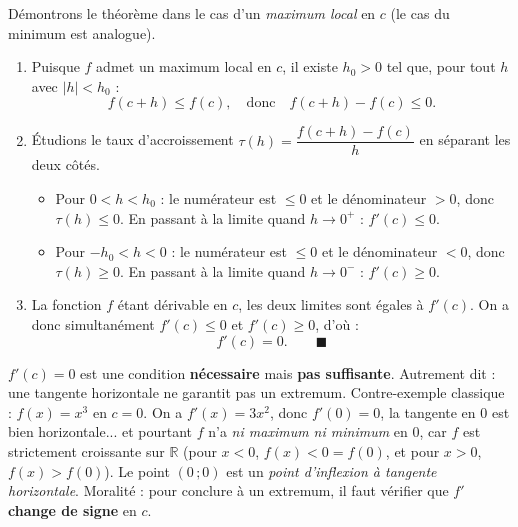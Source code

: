 \documentclass[11pt]{article}
\begin{document}
\begin{experience}
Démontrons le théorème dans le cas d'un \emph{maximum local} en $c$ (le cas du minimum est analogue).
\begin{enumerate}
\item Puisque $f$ admet un maximum local en $c$, il existe $h_0 > 0$ tel que, pour tout $h$ avec $|h| < h_0$ :
\[ f(c+h) \leq f(c), \quad \text{donc} \quad f(c+h) - f(c) \leq 0. \]
\item Étudions le taux d'accroissement $\tau(h) = \dfrac{f(c+h)-f(c)}{h}$ en séparant les deux côtés.
\begin{itemize}
\item Pour $0 < h < h_0$ : le numérateur est $\leq 0$ et le dénominateur $> 0$, donc $\tau(h) \leq 0$. En passant à la limite quand $h \to 0^+$ : $f'(c) \leq 0$.
\item Pour $-h_0 < h < 0$ : le numérateur est $\leq 0$ et le dénominateur $< 0$, donc $\tau(h) \geq 0$. En passant à la limite quand $h \to 0^-$ : $f'(c) \geq 0$.
\end{itemize}
\item La fonction $f$ étant dérivable en $c$, les deux limites sont égales à $f'(c)$. On a donc simultanément $f'(c) \leq 0$ et $f'(c) \geq 0$, d'où :
\[ f'(c) = 0. \qquad \blacksquare \]
\end{enumerate}
\end{experience}

\begin{attention}
$f'(c) = 0$ est une condition \textbf{nécessaire} mais \textbf{pas suffisante}. Autrement dit : une tangente horizontale ne garantit pas un extremum. Contre-exemple classique : $f(x) = x^3$ en $c = 0$. On a $f'(x) = 3x^2$, donc $f'(0) = 0$, la tangente en $0$ est bien horizontale... et pourtant $f$ n'a \emph{ni maximum ni minimum} en $0$, car $f$ est strictement croissante sur $\mathbb{R}$ (pour $x < 0$, $f(x) < 0 = f(0)$, et pour $x > 0$, $f(x) > f(0)$). Le point $(0\,;0)$ est un \emph{point d'inflexion à tangente horizontale}. Moralité : pour conclure à un extremum, il faut vérifier que $f'$ \textbf{change de signe} en $c$.
\end{attention}
\end{document}
